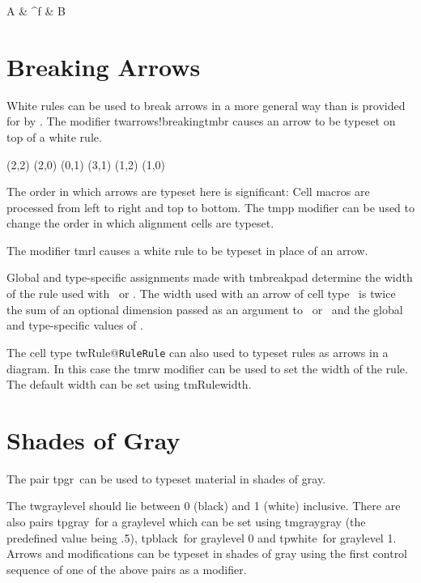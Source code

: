 \side
\Diagram
A & \rFillcell\lrightarrowfill ^f & B \\
\endDiagram
\endside

\section{Breaking Arrows}

White rules can be used to break arrows in a more general way than is
provided for by \csq{\stop}.  The modifier \sindex
tw{arrows!breaking}\index tm{br} causes an arrow to be typeset on top
of a white rule.

\side
{}
\To   (2,2) (2,0)
\Line (0,1) (3,1) \br
\Two  (1,2) (1,0) \br
\endGraph
\endside

The order in which arrows are typeset here is significant: Cell macros
are processed from left to right and top to bottom.  The \index
tm{pp} modifier can be used to change the order in which alignment
cells are typeset.

The modifier \index tm{rl} causes a white rule to be
typeset in place of an arrow.

Global and type-specific assignments made with \index tm{breakpad}
determine the width of the rule used with \csq\br\ or \csq\rl.  The
width used with an arrow of cell type \type\ is twice the sum of an
optional dimension passed as an argument to \csq\br\ or \csq\rl\ and
the global and type-specific values of \csq{\breakpad}.

The cell type \sindex tw{Rule@{\tt Rule}}{\tt Rule} can also used to
typeset rules as arrows in a diagram. In this case the \index tm{rw}
modifier can be used to set the width of the rule. The default width
can be set using \index tm{Rulewidth}.

\section{Shades of Gray}

The pair \index tp{gr}\endgr\ can be used to typeset material in
shades of gray.

\side
{}\vrule width 1cm height 12pt\endgr
\endside

The \iindex tw{graylevel} should lie between 0 (black) and 1 (white)
inclusive.  There are also pairs \index tp{gray}\endgray\ for a
graylevel which can be set using \index tm{graygray} (the predefined
value being .5), \index tp{black}\endblack\ for graylevel 0 and
\index tp{white}\endwhite\ for graylevel 1. Arrows and modifications
can be typeset in shades of gray using the first control sequence of
one of the above pairs as a modifier.

